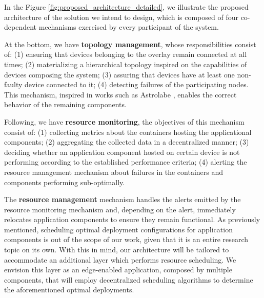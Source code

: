 In the Figure \ref{fig:proposed_architecture_detailed}, we illustrate the proposed architecture of the solution we intend to design, which is composed of four co-dependent mechanisms exercised by every participant of the system.

At the bottom, we have \textbf{topology management}, whose responsibilities consist of: (1) ensuring that devices belonging to the overlay remain connected at all times; (2) materializing a hierarchical topology inspired on the capabilities of devices composing the system; (3) assuring that devices have at least one non-faulty device connected to it; (4) detecting failures of the participating nodes. This mechanism, inspired in works such as Astrolabe \cite{Renesse2003}, enables the correct behavior of the remaining components.

Following, we have \textbf{resource monitoring}, the objectives of this mechanism consist of: (1) collecting metrics about the containers hosting the applicational components; (2) aggregating the collected data in a decentralized manner; (3) deciding whether an application component hosted on certain device is not performing according to the established performance criteria; (4) alerting the resource management mechanism about failures in the containers and components performing sub-optimally.

The \textbf{resource management} mechanism handles the alerts emitted by the resource monitoring mechanism and, depending on the alert, immediately relocates application components to ensure they remain functional. As previously mentioned, scheduling optimal deployment configurations for application components is out of the scope of our work, given that it is an entire research topic on its own. With this in mind, our architecture will be tailored to accommodate an additional layer which performs resource scheduling. We envision this layer as an edge-enabled application, composed by multiple components, that will employ decentralized scheduling algorithms to determine the aforementioned optimal deployments.


